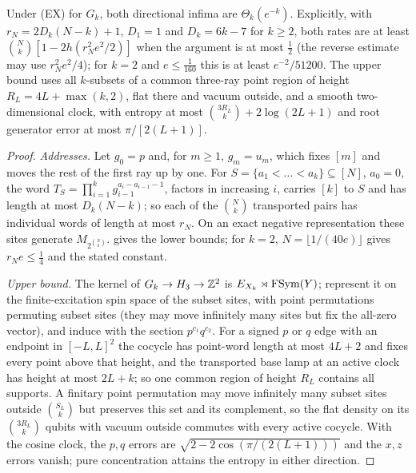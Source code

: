 \begin{theorem}\label{thm:subset}
Under (EX) for $G_k$, both directional infima are $\Theta_k(e^{-k})$. Explicitly, with $r_N=2D_k(N-k)+1$, $D_1=1$ and
$D_k=6k-7$ for $k\ge2$, both rates are at least $\binom Nk[1-2h(r_N^2e^2/2)]$ when the argument is at most $\frac12$ (the reverse
estimate may use $r_N^2e^2/4$); for $k=2$ and $e\le\frac1{160}$ this is at least $e^{-2}/51200$. The upper bound uses all $k$-subsets of a
common three-ray point region of height $R_L=4L+\max(k,2)$, flat there and vacuum outside, and a smooth two-dimensional clock,
with entropy at most $\binom{3R_L}k+2\log(2L+1)$ and root generator error at most $\pi/[2(L+1)]$.
\end{theorem}

\begin{proof}
\emph{Addresses.} Let $g_0=p$ and, for $m\ge1$, $g_m=u_m$, which fixes $[m]$ and moves the rest of the first ray up by one. For
$S=\{a_1<\dots<a_k\}\subseteq[N]$, $a_0=0$, the word $T_S=\prod_{i=1}^kg_{i-1}^{a_i-a_{i-1}-1}$, factors in increasing $i$, carries $[k]$ to
$S$ and has length at most $D_k(N-k)$; so each of the $\binom Nk$ transported pairs has individual words of length at most $r_N$. On
an exact negative representation these sites generate $M_{2^{\binom Nk}}$.  gives the lower bounds; for $k=2$,
$N=\lfloor1/(40e)\rfloor$ gives $r_Ne\le\frac14$ and the stated constant.

\emph{Upper bound.} The kernel of $G_k\to H_3\to\mathbb Z^2$ is $E_{X_k}\rtimes\operatorname{FSym}(Y)$; represent it on the finite-excitation spin space
of the subset sites, with point permutations permuting subset sites (they may move infinitely many sites but fix the all-zero
vector), and induce with the section $p^{c_1}q^{c_2}$. For a signed $p$ or $q$ edge with an endpoint in $[-L,L]^2$ the cocycle has
point-word length at most $4L+2$ and fixes every point above that height, and the transported base lamp at an active clock has
height at most $2L+k$; so one common region of height $R_L$ contains all supports. A finitary point permutation may move
infinitely many subset sites outside $\binom{S_L}k$ but preserves this set and its complement, so the flat density on its
$\binom{3R_L}k$ qubits with vacuum outside commutes with every active cocycle. With the cosine clock, the $p,q$ errors are
$\sqrt{2-2\cos(\pi/(2(L+1)))}$ and the $x,z$ errors vanish; pure concentration attains the entropy in either direction.
\end{proof}

